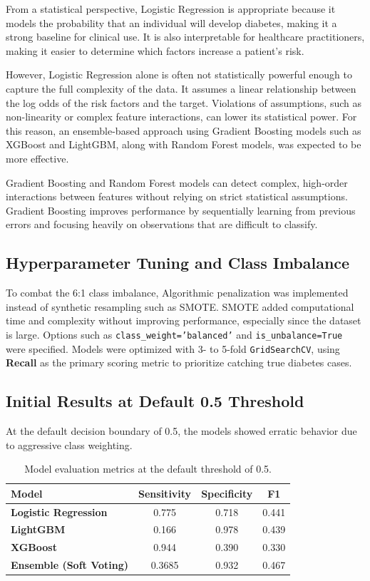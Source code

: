 \documentclass[11pt,letterpaper]{article}
\begin{document}
From a statistical perspective, Logistic Regression is appropriate because it models the probability that an individual will develop diabetes, making it a strong baseline for clinical use. It is also interpretable for healthcare practitioners, making it easier to determine which factors increase a patient's risk.

However, Logistic Regression alone is often not statistically powerful enough to capture the full complexity of the data. It assumes a linear relationship between the log odds of the risk factors and the target. Violations of assumptions, such as non-linearity or complex feature interactions, can lower its statistical power. For this reason, an ensemble-based approach using Gradient Boosting models such as XGBoost and LightGBM, along with Random Forest models, was expected to be more effective.

Gradient Boosting and Random Forest models can detect complex, high-order interactions between features without relying on strict statistical assumptions. Gradient Boosting improves performance by sequentially learning from previous errors and focusing heavily on observations that are difficult to classify.

\subsection{Hyperparameter Tuning and Class Imbalance}
To combat the 6:1 class imbalance, Algorithmic penalization was implemented instead of synthetic resampling such as SMOTE. SMOTE added computational time and complexity without improving performance, especially since the dataset is large. Options such as \texttt{class\_weight='balanced'} and \texttt{is\_unbalance=True} were specified. Models were optimized with 3- to 5-fold \texttt{GridSearchCV}, using \textbf{Recall} as the primary scoring metric to prioritize catching true diabetes cases.

\subsection{Initial Results at Default 0.5 Threshold}
At the default decision boundary of 0.5, the models showed erratic behavior due to aggressive class weighting.

\begin{table}[H]
\centering
\caption{Model evaluation metrics at the default threshold of 0.5.}
\begin{tabularx}{\linewidth}{>{\bfseries}Xccc}
\toprule
Model & Sensitivity & Specificity & F1 \\
\midrule
Logistic Regression & 0.775 & 0.718 & 0.441 \\
LightGBM & 0.166 & 0.978 & 0.439 \\
XGBoost & 0.944 & 0.390 & 0.330 \\
Ensemble (Soft Voting) & 0.3685 & 0.932 & 0.467 \\
\bottomrule
\end{tabularx}
\end{table}
\end{document}
